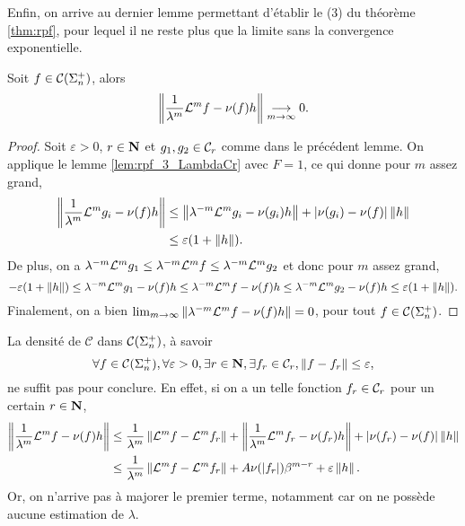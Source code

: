   Enfin, on arrive au dernier lemme permettant d'établir le (3) du théorème \ref{thm:rpf}, pour lequel il ne reste plus que la limite
  sans la convergence exponentielle.

  \begin{proposition}
    \label{prop:rpf_3}
    Soit $f \in \mathcal{C} (\Sigma_{n}^+)$, alors
    $$\left\lVert \frac 1 {\lambda^m} \mathcal{L}^mf - \nu(f)h\right\rVert \underset{m \to \infty}{\longrightarrow} 0.$$
  \end{proposition}

  \begin{proof}
    Soit $\varepsilon > 0$, $r \in \mathbf N$ et $g_1, g_2 \in \mathcal C_{r}$ comme dans le précédent lemme.
    On applique le lemme \ref{lem:rpf_3_LambdaCr} avec $F = 1$, ce qui donne pour $m$ assez grand,
    \begin{align*}
      \left\lVert \frac 1 {\lambda^m}\mathcal{L}^m g_i - \nu(f)h\right\rVert &\leq \left\lVert \lambda^{-m}\mathcal{L}^mg_i - \nu(g_i)h\right\rVert + \left|\nu(g_i) - \nu(f)\right|\left\lVert h\right\rVert \\
						 &\leq \varepsilon(1 + \left\lVert h\right\rVert).
    \end{align*}
    De plus, on a $\lambda^{-m}\mathcal{L}^mg_1 \leq \lambda^{-m}\mathcal{L}^mf \leq \lambda^{-m}\mathcal{L}^mg_2$ et donc pour $m$ assez grand,
    $$-\varepsilon(1 + \left\lVert h\right\rVert) \leq \lambda^{-m}\mathcal{L}^mg_1 - \nu(f)h
			       \leq \lambda^{-m}\mathcal{L}^mf - \nu(f)h \leq \lambda^{-m}\mathcal{L}^mg_2 - \nu(f)h
								\leq \varepsilon(1+\left\lVert h\right\rVert).
    $$
    Finalement, on a bien $\lim_{m\to\infty}{\left\lVert \lambda^{-m}\mathcal{L}^mf - \nu(f)h\right\rVert} = 0$, pour tout $f \in \mathcal{C} (\Sigma_{n}^+)$.
  \end{proof}

  \begin{remark}
    La densité de $\mathcal C$ dans $\mathcal{C} (\Sigma_{n}^+)$, à savoir
    $$\forall f \in\mathcal{C} (\Sigma_{n}^+), \forall \varepsilon > 0, \exists r \in \mathbf N, \exists f_r\in \mathcal C_{r}, \left\lVert f - f_r\right\rVert \leq \varepsilon,$$
    ne suffit pas pour conclure. En effet, si on a un telle fonction $f_r \in \mathcal C_{r}$ pour un certain $r \in \mathbf N$,
    \begin{align*}
      \left\lVert \frac 1 {\lambda^m}\mathcal{L}^mf  - \nu(f)h\right\rVert &\leq \frac{1}{\lambda^m}\left\lVert \mathcal{L}^mf - \mathcal{L}^mf_r\right\rVert
						      + \left\lVert \frac 1 {\lambda^m}\mathcal{L}^mf_r - \nu(f_r)h\right\rVert
						      + |\nu(f_r) - \nu(f)|\left\lVert h\right\rVert \\
					    &\leq \frac{1}{\lambda^m}\left\lVert \mathcal{L}^mf - \mathcal{L}^mf_r\right\rVert + A\nu(|f_r|)\beta^{m - r} + \varepsilon\left\lVert h\right\rVert.
    \end{align*}
    Or, on n'arrive pas à majorer le premier terme, notamment car on ne possède aucune estimation de $\lambda$.
  \end{remark}
